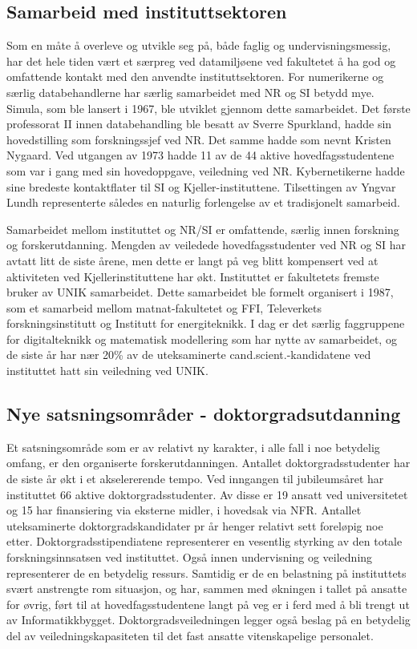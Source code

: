 \documentclass[../main.tex]{subfiles}
\begin{document}
\subsection{Samarbeid med instituttsektoren}
Som en måte å overleve og utvikle seg på, både faglig og undervisningsmessig, har det hele tiden vært et særpreg ved datamiljøene ved fakultetet å ha god og omfattende kontakt med den anvendte instituttsektoren. For numerikerne og særlig databehandlerne har særlig samarbeidet med NR og SI betydd mye. Simula, som ble lansert i 1967, ble utviklet gjennom dette samarbeidet. Det første professorat II innen databehandling ble besatt av Sverre Spurkland, hadde sin hovedstilling som forskningssjef ved NR. Det samme hadde som nevnt Kristen Nygaard. Ved utgangen av 1973 hadde 11 av de 44 aktive hovedfagsstudentene som var i gang med sin hovedoppgave, veiledning ved NR. Kybernetikerne hadde sine bredeste kontaktflater til SI og Kjeller-instituttene. Tilsettingen av Yngvar Lundh representerte således en naturlig forlengelse av et tradisjonelt samarbeid.

Samarbeidet mellom instituttet og NR/SI er omfattende, særlig innen forskning og forskerutdanning. Mengden av veiledede hovedfagsstudenter ved NR og SI har avtatt litt de siste årene, men dette er langt på veg blitt kompensert ved at aktiviteten ved Kjellerinstituttene har økt. Instituttet er fakultetets fremste bruker av UNIK samarbeidet. Dette samarbeidet ble formelt organisert i 1987, som et samarbeid mellom matnat-fakultetet og FFI, Televerkets forskningsinstitutt og Institutt for energiteknikk. I dag er det særlig faggruppene for digitalteknikk og matematisk modellering som har nytte av samarbeidet, og de siste år har nær 20\% av de uteksaminerte cand.scient.-kandidatene ved instituttet hatt sin veiledning ved UNIK.

\subsection{Nye satsningsområder - doktorgradsutdanning}
Et satsningsområde som er av relativt ny karakter, i alle fall i noe betydelig omfang, er den organiserte forskerutdanningen. Antallet doktorgradsstudenter har de siste år økt i et akselererende tempo. Ved inngangen til jubileumsåret har instituttet 66 aktive doktorgradsstudenter. Av disse er 19 ansatt ved universitetet og 15 har finansiering via eksterne midler, i hovedsak via NFR. Antallet uteksaminerte doktorgradskandidater pr år henger relativt sett foreløpig noe etter. Doktorgradsstipendiatene representerer en vesentlig styrking av den totale forskningsinnsatsen ved instituttet. Også innen undervisning og veiledning representerer de en betydelig ressurs. Samtidig er de en belastning på instituttets svært anstrengte rom situasjon, og har, sammen med økningen i tallet på ansatte for øvrig, ført til at hovedfagsstudentene langt på veg er i ferd med å bli trengt ut av Informatikkbygget. Doktorgradsveiledningen legger også beslag på en betydelig del av veiledningskapasiteten til det fast ansatte vitenskapelige personalet.
\end{document}
